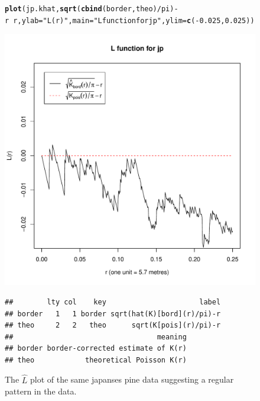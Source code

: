 \documentclass{article}\usepackage[]{graphicx}\usepackage[]{color}
\makeatletter
\def\maxwidth{ %
  \ifdim\Gin@nat@width>\linewidth
    \linewidth
  \else
    \Gin@nat@width
  \fi
}
\newcommand{\hlnum}[1]{\textcolor[rgb]{0.686,0.059,0.569}{#1}}%
\newcommand{\hlstr}[1]{\textcolor[rgb]{0.192,0.494,0.8}{#1}}%
\newcommand{\hlopt}[1]{\textcolor[rgb]{0,0,0}{#1}}%
\newcommand{\hlstd}[1]{\textcolor[rgb]{0.345,0.345,0.345}{#1}}%
\newcommand{\hlkwc}[1]{\textcolor[rgb]{0.333,0.667,0.333}{#1}}%
\newcommand{\hlkwd}[1]{\textcolor[rgb]{0.737,0.353,0.396}{\textbf{#1}}}%
\newenvironment{kframe}{%
 \def\at@end@of@kframe{}%
 \ifinner\ifhmode%
  \def\at@end@of@kframe{\end{minipage}}%
  \begin{minipage}{\columnwidth}%
 \fi\fi%
 \def\FrameCommand##1{\hskip\@totalleftmargin \hskip-\fboxsep
 \colorbox{shadecolor}{##1}\hskip-\fboxsep
     \hskip-\linewidth \hskip-\@totalleftmargin \hskip\columnwidth}%
 \MakeFramed {\advance\hsize-\width
   \@totalleftmargin\z@ \linewidth\hsize
   \@setminipage}}%
 {\par\unskip\endMakeFramed%
 \at@end@of@kframe}
\newenvironment{knitrout}{}{} %
\makeatother
\begin{document}
\begin{figure}
\begin{knitrout}
\color{fgcolor}\begin{kframe}
\begin{alltt}
\hlkwd{plot}\hlstd{(jp.khat,} \hlkwd{sqrt}\hlstd{(}\hlkwd{cbind}\hlstd{(border, theo)}\hlopt{/}\hlstd{pi)}\hlopt{-}\hlstd{r}\hlopt{~}\hlstd{r,}\hlkwc{ylab}\hlstd{=}\hlstr{"L(r)"}\hlstd{,} \hlkwc{main}\hlstd{=}\hlstr{"L function for jp"}\hlstd{,} \hlkwc{ylim}\hlstd{=}\hlkwd{c}\hlstd{(}\hlopt{-}\hlnum{0.025}\hlstd{,} \hlnum{0.025}\hlstd{))}
\end{alltt}
\end{kframe}
\includegraphics[width=\maxwidth]{figure/Lhat} 
\begin{kframe}\begin{verbatim}
##        lty col    key                      label
## border   1   1 border sqrt(hat(K)[bord](r)/pi)-r
## theo     2   2   theo      sqrt(K[pois](r)/pi)-r
##                                  meaning
## border border-corrected estimate of K(r)
## theo            theoretical Poisson K(r)
\end{verbatim}
\end{kframe}
\end{knitrout}
\caption{The $\hat{L}$ plot of the same japanses pine data suggesting a regular pattern in the data.}
\label{lest}
\end{figure}
\end{document}
